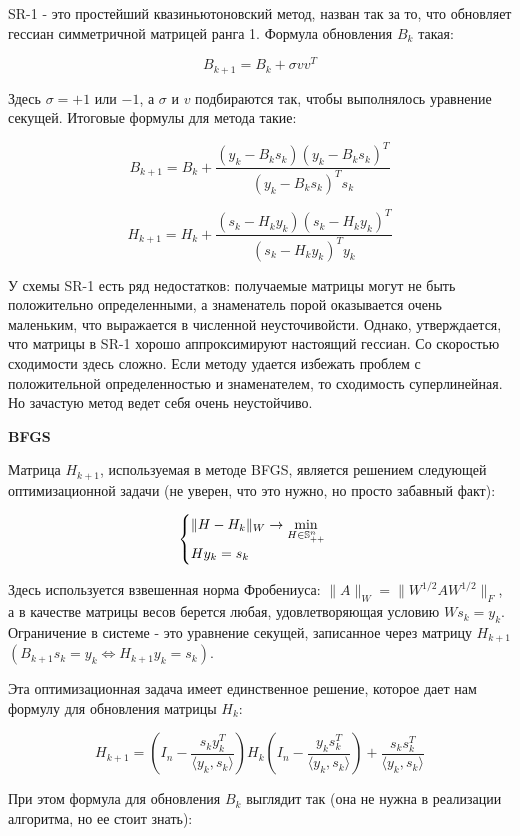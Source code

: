 SR-1 - это простейший квазиньютоновский метод, назван так за то, что обновляет гессиан симметричной матрицей ранга 1. Формула обновления $B_k$ такая:

$$
B_{k+1} = B_k + \sigma v v^T
$$

\noindent
Здесь $\sigma = +1$ или $-1$, а $\sigma$ и $v$ подбираются так, чтобы выполнялось уравнение секущей. Итоговые формулы для метода такие:

$$
B_{k+1} = B_k + \frac{(y_k - B_k s_k)(y_k - B_k s_k)^T}{(y_k - B_k s_k)^T s_k}
$$

$$
H_{k+1} = H_k + \frac{(s_k - H_k y_k)(s_k - H_k y_k)^T}{(s_k - H_k y_k)^T y_k}
$$

\noindent
У схемы SR-1 есть ряд недостатков: получаемые матрицы могут не быть положительно определенными, а знаменатель порой оказывается очень маленьким, что выражается в численной неусточивойсти. Однако, утверждается, что матрицы в SR-1 хорошо аппроксимируют настоящий гессиан. Со скоростью сходимости здесь сложно. Если методу удается избежать проблем с положительной определенностью и знаменателем, то сходимость суперлинейная. Но зачастую метод ведет себя очень неустойчиво.

\vspace{6pt}
\textbf{\large BFGS}

Матрица $H_{k+1}$, используемая в методе BFGS, является решением следующей оптимизационной задачи (не уверен, что это нужно, но просто забавный факт):

$$
\begin{cases}
    \|H - H_k\|_W \rightarrow \displaystyle\min_{H \in \mathbb{S}^n_{++}} \\
    H y_k = s_k
\end{cases}
$$

\noindent
Здесь используется взвешенная норма Фробениуса: $\|A\|_W = \|W^{1/2} A W^{1/2}\|_F$, а в качестве матрицы весов берется любая, удовлетворяющая условию $W s_k = y_k$. Ограничение в системе - это уравнение секущей, записанное через матрицу $H_{k+1}$ $(B_{k+1} s_k = y_k \Leftrightarrow H_{k+1} y_k = s_k)$.

Эта оптимизационная задача имеет единственное решение, которое дает нам формулу для обновления матрицы $H_k$:

$$
H_{k+1} = \left(I_n - \frac{s_k y_k^T}{\langle y_k, s_k \rangle}\right) H_k \left(I_n - \frac{y_k s_k^T}{\langle y_k, s_k \rangle}\right) + \frac{s_k s_k^T}{\langle y_k, s_k \rangle}
$$

\noindent
При этом формула для обновления $B_k$ выглядит так (она не нужна в реализации алгоритма, но ее стоит знать):

